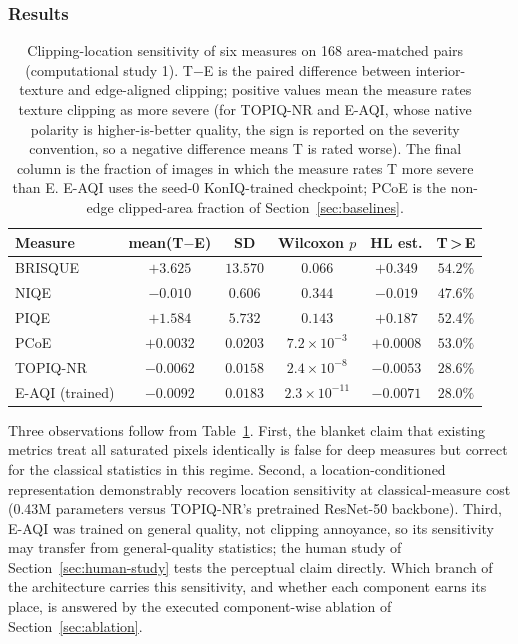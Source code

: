 \documentclass[5p,times,twocolumn]{elsarticle}
\begin{document}
\subsubsection{Results}

\begin{table}[t]
\centering
\caption{Clipping-location sensitivity of six measures on 168 area-matched
pairs (computational study 1). T$-$E is the paired difference between
interior-texture and edge-aligned clipping; positive values mean the measure
rates texture clipping as more severe (for TOPIQ-NR and E-AQI, whose native
polarity is higher-is-better quality, the sign is reported on the severity
convention, so a negative difference means T is rated worse). The final
column is the fraction of images in which the measure rates T more severe
than E. E-AQI uses the seed-0 KonIQ-trained checkpoint; PCoE is the non-edge
clipped-area fraction of Section~\ref{sec:baselines}.}
\label{tab:location}
\footnotesize
\setlength{\tabcolsep}{3.5pt}
\begin{tabular}{@{}lccccc@{}}
\toprule
Measure & mean(T$-$E) & SD & Wilcoxon $p$ & HL est. & T\,>\,E \\
\midrule
BRISQUE  & $+3.625$ & $13.570$ & $0.066$ & $+0.349$ & $54.2\%$ \\
NIQE     & $-0.010$ & $0.606$  & $0.344$ & $-0.019$ & $47.6\%$ \\
PIQE     & $+1.584$ & $5.732$  & $0.143$ & $+0.187$ & $52.4\%$ \\
PCoE     & $+0.0032$ & $0.0203$ & $7.2\times10^{-3}$ & $+0.0008$ & $53.0\%$ \\
TOPIQ-NR & $-0.0062$ & $0.0158$ & $2.4\times10^{-8}$ & $-0.0053$ & $28.6\%$ \\
E-AQI (trained) & $-0.0092$ & $0.0183$ & $2.3\times10^{-11}$ & $-0.0071$ & $28.0\%$ \\
\bottomrule
\end{tabular}
\end{table}

Three observations follow from Table~\ref{tab:location}. First, the blanket
claim that existing metrics treat all saturated pixels identically is false
for deep measures but correct for the classical statistics in this regime.
Second, a location-conditioned representation demonstrably recovers location
sensitivity at classical-measure cost (0.43M parameters versus TOPIQ-NR's
pretrained ResNet-50 backbone). Third, E-AQI was trained on general quality,
not clipping annoyance, so its sensitivity may transfer from
general-quality statistics; the human study of
Section~\ref{sec:human-study} tests the perceptual claim directly.
Which branch of the architecture carries this sensitivity, and whether each
component earns its place, is answered by the executed component-wise
ablation of Section~\ref{sec:ablation}.
\end{document}
